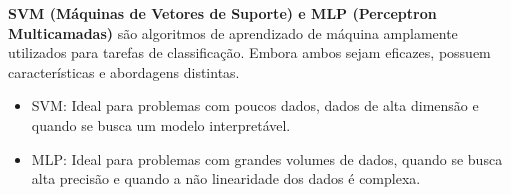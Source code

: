 \documentclass[12pt,a4paper,oneside,openany]{article}
\begin{document}
\noindent\textbf{SVM (Máquinas de Vetores de Suporte) e MLP (Perceptron Multicamadas)} são algoritmos de aprendizado de máquina amplamente utilizados para tarefas de classificação. Embora ambos sejam eficazes, possuem características e abordagens distintas.

\begin{table}[h!]
\centering
{}
\caption{Comparação entre SVM e MLP}
\label{tab:svm_mlp_comparison}
\end{table}


\begin{itemize}
    \item SVM: Ideal para problemas com poucos dados, dados de alta dimensão e quando se busca um modelo interpretável.
    \item MLP: Ideal para problemas com grandes volumes de dados, quando se busca alta precisão e quando a não linearidade dos dados é complexa.
\end{itemize}
\end{document}
